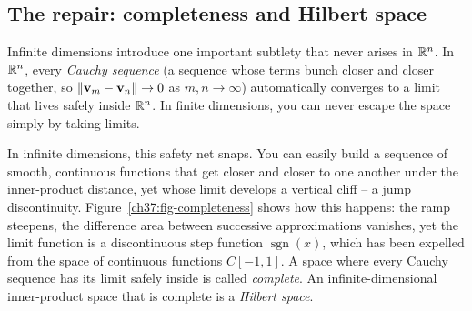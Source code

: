 \subsection{The repair: completeness and Hilbert space}
\label{ch37:hilbert}

Infinite dimensions introduce one important subtlety that never arises in $\mathbb{R}^n$. In $\mathbb{R}^n$,
every \emph{Cauchy sequence} (a sequence whose terms bunch closer and closer together,
so $\lVert\mathbf{v}_m-\mathbf{v}_n\rVert\to 0$ as $m,n\to\infty$) automatically converges to a
limit that lives safely inside $\mathbb{R}^n$. In finite dimensions, you can never escape the
space simply by taking limits.

In infinite dimensions, this safety net snaps. You can easily build a sequence of
smooth, continuous functions that get closer and closer to one another under the
inner-product distance, yet whose limit develops a vertical cliff -- a jump
discontinuity. Figure~\ref{ch37:fig-completeness} shows how this happens: the ramp
steepens, the difference area between successive approximations vanishes, yet the limit
function is a discontinuous step function $\operatorname{sgn}(x)$, which has been expelled
from the space of continuous functions $C[-1,1]$. A space where every Cauchy sequence has its limit safely inside is called
\emph{complete}. An infinite-dimensional inner-product space that is complete is a
\emph{Hilbert space}.

